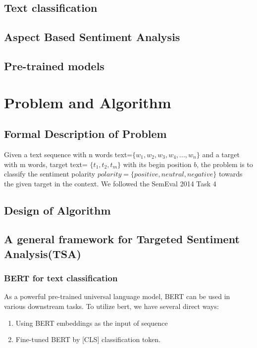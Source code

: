 \documentclass[fyp]{socreport}
\begin{document}
\section{Text classification}



\section{Aspect Based Sentiment Analysis}

\section{Pre-trained models}







\chapter{Problem and Algorithm}
\section{Formal Description of Problem}
Given a text sequence with n words text=$\{w_1,w_2,w_3,w_4,...,w_n\}$ and a target with m words, target text=  $\{t_1,t_2,t_m\}$ with its begin position $b$, the problem is to classify the sentiment polarity $polarity=\{positive,neutral,negative\}$ towards the given target in the context. We followed the SemEval 2014 Task 4\cite{pontiki-etal-2014-semeval}




\section{Design of Algorithm}
\section{A general framework for Targeted Sentiment Analysis(TSA)}

\subsection{BERT for text classification}


As a powerful pre-trained universal language model, BERT can be used in various downstream tasks.
To utilize bert, we have several direct ways:
\begin{enumerate}
    \item Using BERT embeddings as the input of sequence
    \item Fine-tuned BERT by [CLS] classification token.
\end{enumerate}
\end{document}
